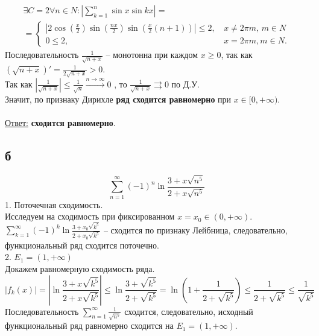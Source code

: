 \documentclass[a5paper, 10pt]{article}
\theoremstyle{definition}
\theoremstyle{plain}
\theoremstyle{remark}
\begin{document}
\begin{multline*}
\exists C= 2 \forall n \in N :  \left| \sum  \limits_{k = 1}^{n}  \sin x \sin kx \right| = \\ =
\begin{cases}
   \left|  2 \cos \left(\frac{x}{2}\right) \sin \left(\frac{nx}{2}\right) \sin \left(\frac{x}{2}(n+1)\right) \right| \leq 2,  & \, x \neq 2\pi m, \, m \in N \\
   0 \leq 2, &\, x = 2\pi m, m \in N.
 \end{cases}
\end{multline*}
Последовательность $\frac{1}{\sqrt{n + x}}$ -- монотонна при каждом $x \geq 0$, так как $\left(\sqrt{n + x} \right)' = \frac{1}{2\sqrt{n + x}} > 0$.\\
Так как $\left|\frac{1}{\sqrt{n + x}} \right| \leq \frac{1}{\sqrt{n}} \xrightarrow{n \to \infty} 0$ , то $\frac{1}{\sqrt{n + x}} \rightrightarrows 0$ по Д.У.\\
Значит, по признаку Дирихле \textbf{ряд сходится равномерно} при  $ x \in [0, + \infty)$.\\\\
\underline{Ответ:}   \textbf{сходится равномерно}.

\newpage
\subsection{б}
\begin{equation*}
\sum  \limits_{n = 1}^{\infty}(-1)^n \ln \frac{3+x\sqrt{n^5}}{2+x\sqrt{n^5}}
\end{equation*}
1. Поточечная сходимость.\\
Исследуем на сходимость при фиксированном $x = x_0 \in (0, + \infty)$. $\sum  \limits_{k = 1}^{\infty} (-1)^k \ln \frac{3+x_0 \sqrt{k^5}}{2+x_0 \sqrt{k^5}}$ -- сходится по признаку Лейбница, следовательно, функциональный ряд сходится поточечно.\\

2.  $ E_1 = (1 , + \infty)$\\
Докажем равномерную сходимость ряда. 
\begin{equation*}
\left| f_k (x) \right| = \left| \ln \frac{3+x \sqrt{k^5}}{2+x\sqrt{k^5}} \right| \leq \ln \frac{3+\sqrt{k^5}}{2+\sqrt{k^5}}
= \ln \left( 1 +  \frac{1}{2+\sqrt{k^5}} \right) \leq \frac{1}{2+\sqrt{k^5}} \leq  \frac{1}{\sqrt{k^5}}
\end{equation*}
Последовательность $ \sum  \limits_{n = 1}^{\infty} \frac{1}{\sqrt{n^5}}$ сходится, следовательно, исходный функциональный ряд равномерно сходится на $ E_1 = (1 , + \infty)$.\\
\end{document}
